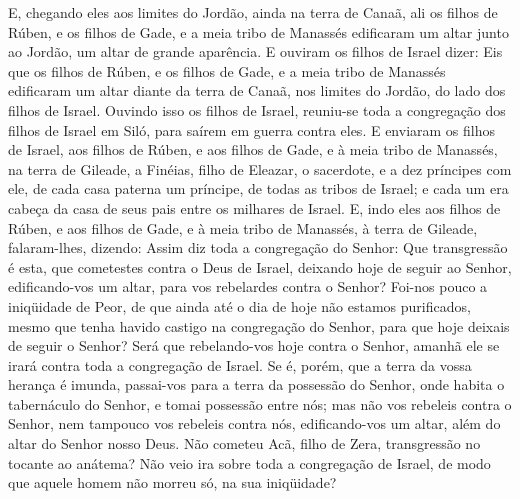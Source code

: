 E, chegando eles aos limites do Jordão, ainda na terra de Canaã,
ali os filhos de Rúben, e os filhos de Gade, e a meia tribo de
Manassés edificaram um altar junto ao Jordão, um altar de grande
aparência. E ouviram os filhos de Israel dizer: Eis que os
filhos de Rúben, e os filhos de Gade, e a meia tribo de Manassés
edificaram um altar diante da terra de Canaã, nos limites do Jordão,
do lado dos filhos de Israel. Ouvindo isso os filhos de
Israel, reuniu-se toda a congregação dos filhos de Israel em Siló,
para saírem em guerra contra eles. E enviaram os filhos de
Israel, aos filhos de Rúben, e aos filhos de Gade, e à meia tribo de
Manassés, na terra de Gileade, a Finéias, filho de Eleazar, o
sacerdote, e a dez príncipes com ele, de cada casa paterna um
príncipe, de todas as tribos de Israel; e cada um era cabeça da casa
de seus pais entre os milhares de Israel. E, indo eles aos
filhos de Rúben, e aos filhos de Gade, e à meia tribo de Manassés, à
terra de Gileade, falaram-lhes, dizendo: Assim diz toda a
congregação do Senhor: Que transgressão é esta, que cometestes
contra o Deus de Israel, deixando hoje de seguir ao Senhor,
edificando-vos um altar, para vos rebelardes contra o Senhor?
Foi-nos pouco a iniqüidade de Peor, de que ainda até o dia de
hoje não estamos purificados, mesmo que tenha havido castigo na
congregação do Senhor, para que hoje deixais de seguir o
Senhor? Será que rebelando-vos hoje contra o Senhor, amanhã ele se
irará contra toda a congregação de Israel. Se é, porém, que a
terra da vossa herança é imunda, passai-vos para a terra da
possessão do Senhor, onde habita o tabernáculo do Senhor, e tomai
possessão entre nós; mas não vos rebeleis contra o Senhor, nem
tampouco vos rebeleis contra nós, edificando-vos um altar, além do
altar do Senhor nosso Deus. Não cometeu Acã, filho de Zera,
transgressão no tocante ao anátema? Não veio ira sobre toda a
congregação de Israel, de modo que aquele homem não morreu só, na
sua iniqüidade?


